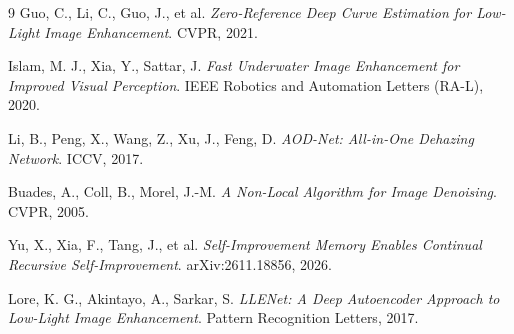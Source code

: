 \documentclass[11pt,letterpaper]{article}
\begin{document}
\begin{thebibliography}{9}
Guo, C., Li, C., Guo, J., et al. \emph{Zero-Reference Deep Curve Estimation for Low-Light
Image Enhancement}. CVPR, 2021.

Islam, M. J., Xia, Y., Sattar, J. \emph{Fast Underwater Image Enhancement for Improved Visual
Perception}. IEEE Robotics and Automation Letters (RA-L), 2020.

Li, B., Peng, X., Wang, Z., Xu, J., Feng, D. \emph{AOD-Net: All-in-One Dehazing Network}.
ICCV, 2017.

Buades, A., Coll, B., Morel, J.-M. \emph{A Non-Local Algorithm for Image Denoising}. CVPR, 2005.

Yu, X., Xia, F., Tang, J., et al. \emph{Self-Improvement Memory Enables Continual Recursive
Self-Improvement}. arXiv:2611.18856, 2026.

Lore, K. G., Akintayo, A., Sarkar, S. \emph{LLENet: A Deep Autoencoder Approach to Low-Light
Image Enhancement}. Pattern Recognition Letters, 2017.
\end{thebibliography}
\end{document}
